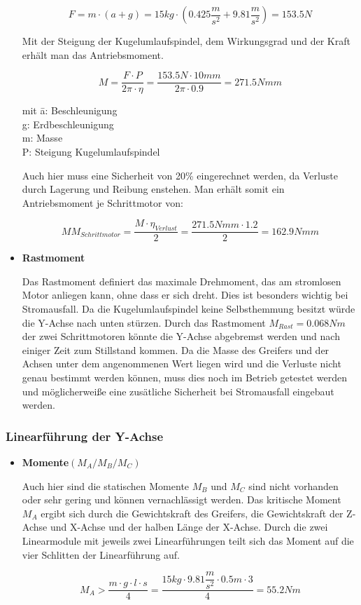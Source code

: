 \begin{itemize}
\[F=m\cdot (a+g)=15kg\cdot (0.425\dfrac{m}{s^2}+9.81 \dfrac{m}{s^2})=153.5N\]

Mit der Steigung der Kugelumlaufspindel, dem Wirkungsgrad und der Kraft erhält man das Antriebsmoment.

\[M=\dfrac{F\cdot P}{2\pi\cdot \eta}=\dfrac{153.5N\cdot 10mm}{2\pi\cdot 0.9}=271.5Nmm\]



\begin{tabbing}
mit \=a: Beschleunigung\\
		\>g: Erdbeschleunigung\\
		\>m: Masse\\
		\>P: Steigung Kugelumlaufspindel\\
		
\end{tabbing}

Auch hier muss eine Sicherheit von 20\% eingerechnet werden, da Verluste durch Lagerung und Reibung enstehen.   
Man erhält somit ein Antriebsmoment je Schrittmotor von:

\[M{M_{Schrittmotor}}=\dfrac{M\cdot \eta_{Verlust}}{2}=\dfrac{271.5Nmm\cdot 1.2}{2}=162.9 Nmm\]


\item \textbf{Rastmoment}

Das Rastmoment definiert das maximale Drehmoment, das am stromlosen Motor anliegen kann, ohne dass er sich dreht.
Dies ist besonders wichtig bei Stromausfall. Da die Kugelumlaufspindel keine Selbsthemmung besitzt würde die Y-Achse
nach unten stürzen. Durch das Rastmoment $M_{Rast}=0.068Nm$ der zwei Schrittmotoren könnte die Y-Achse abgebremst werden und nach einiger Zeit zum Stillstand kommen. Da die Masse des Greifers und der Achsen unter dem angenommenen Wert liegen wird und die Verluste nicht genau bestimmt werden können, muss dies noch im Betrieb getestet werden und möglicherweiße eine zusätliche Sicherheit bei Stromausfall eingebaut werden. 


\end{itemize}
\newpage
\subsubsection{Linearführung der Y-Achse}

\begin{itemize}
\item \textbf{Momente$(M_A/M_B/M_C)$}

Auch hier sind die statischen Momente $M_B$ und $M_C$ sind nicht vorhanden oder sehr gering und können vernachlässigt werden. Das kritische Moment $M_A$ ergibt sich durch die Gewichtskraft des Greifers, die Gewichtskraft der Z-Achse und X-Achse und der halben Länge der X-Achse. Durch die zwei Linearmodule mit jeweils zwei Linearführungen teilt sich das Moment auf die vier Schlitten der Linearführung auf.

\[M_A>\dfrac{m\cdot g \cdot l \cdot s}{4}=\dfrac{15kg\cdot 9.81\dfrac{m}{s^2}\cdot 0.5m\cdot 3}{4}=55.2Nm\]


\end{itemize}

